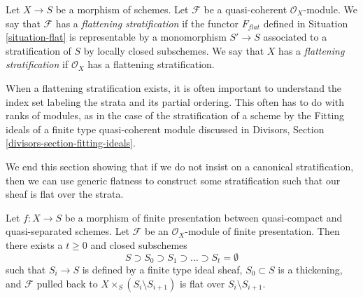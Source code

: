 \begin{definition}
\label{definition-flattening-stratification}
Let $X \to S$ be a morphism of schemes.
Let $\mathcal{F}$ be a quasi-coherent $\mathcal{O}_X$-module.
We say that $\mathcal{F}$ has a {\it flattening stratification}
if the functor $F_{flat}$ defined in Situation \ref{situation-flat}
is representable by a monomorphism $S' \to S$ associated
to a stratification of $S$ by locally closed subschemes.
We say that $X$ has a {\it flattening stratification}
if $\mathcal{O}_X$ has a flattening stratification.
\end{definition}

\noindent
When a flattening stratification exists, it is often important
to understand the index set labeling the strata and its partial ordering.
This often has to do with ranks of modules, as in the case of
the stratification of a scheme by the Fitting ideals of a finite
type quasi-coherent module discussed in
Divisors, Section \ref{divisors-section-fitting-ideals}.

\medskip\noindent
We end this section showing that if we do not insist on a canonical
stratification, then we can use generic flatness to construct some
stratification such that our sheaf is flat over the strata.

\begin{lemma}
\label{lemma-generic-flatness-stratification}
Let $f : X \to S$ be a morphism of finite presentation between quasi-compact
and quasi-separated schemes. Let $\mathcal{F}$ be an $\mathcal{O}_X$-module
of finite presentation. Then there exists a $t \geq 0$ and closed
subschemes
$$
S \supset S_0 \supset S_1 \supset \ldots \supset S_t = \emptyset
$$
such that $S_i \to S$ is defined by a finite type ideal sheaf,
$S_0 \subset S$ is a thickening, and $\mathcal{F}$ pulled back to
$X \times_S (S_i \setminus S_{i + 1})$ is flat over $S_i \setminus S_{i + 1}$.
\end{lemma}

